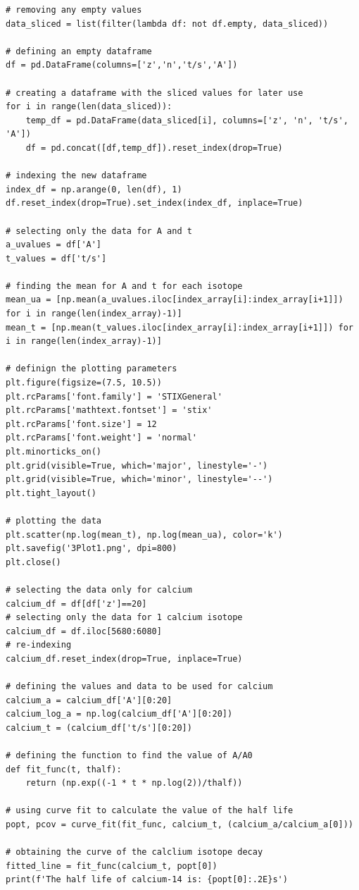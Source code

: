 \documentclass[12pt, a4paper]{article}
\begin{document}
\begin{verbatim}
# removing any empty values
data_sliced = list(filter(lambda df: not df.empty, data_sliced))

# defining an empty dataframe
df = pd.DataFrame(columns=['z','n','t/s','A'])

# creating a dataframe with the sliced values for later use
for i in range(len(data_sliced)):
    temp_df = pd.DataFrame(data_sliced[i], columns=['z', 'n', 't/s', 'A'])
    df = pd.concat([df,temp_df]).reset_index(drop=True)

# indexing the new dataframe
index_df = np.arange(0, len(df), 1)
df.reset_index(drop=True).set_index(index_df, inplace=True)

# selecting only the data for A and t
a_uvalues = df['A']
t_values = df['t/s']

# finding the mean for A and t for each isotope
mean_ua = [np.mean(a_uvalues.iloc[index_array[i]:index_array[i+1]]) for i in range(len(index_array)-1)]
mean_t = [np.mean(t_values.iloc[index_array[i]:index_array[i+1]]) for i in range(len(index_array)-1)]

# definign the plotting parameters
plt.figure(figsize=(7.5, 10.5))
plt.rcParams['font.family'] = 'STIXGeneral'
plt.rcParams['mathtext.fontset'] = 'stix'
plt.rcParams['font.size'] = 12
plt.rcParams['font.weight'] = 'normal'
plt.minorticks_on()
plt.grid(visible=True, which='major', linestyle='-')
plt.grid(visible=True, which='minor', linestyle='--')
plt.tight_layout()

# plotting the data
plt.scatter(np.log(mean_t), np.log(mean_ua), color='k')
plt.savefig('3Plot1.png', dpi=800)
plt.close()

# selecting the data only for calcium
calcium_df = df[df['z']==20]
# selecting only the data for 1 calcium isotope
calcium_df = df.iloc[5680:6080]
# re-indexing
calcium_df.reset_index(drop=True, inplace=True)

# defining the values and data to be used for calcium
calcium_a = calcium_df['A'][0:20]
calcium_log_a = np.log(calcium_df['A'][0:20])
calcium_t = (calcium_df['t/s'][0:20])

# defining the function to find the value of A/A0
def fit_func(t, thalf):
    return (np.exp((-1 * t * np.log(2))/thalf))

# using curve fit to calculate the value of the half life
popt, pcov = curve_fit(fit_func, calcium_t, (calcium_a/calcium_a[0]))

# obtaining the curve of the calclium isotope decay
fitted_line = fit_func(calcium_t, popt[0])
print(f'The half life of calcium-14 is: {popt[0]:.2E}s')


\end{verbatim}
\end{document}

